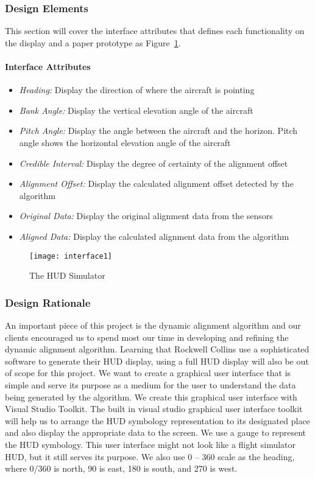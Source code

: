 		\subsubsection{Design Elements}
		This section will cover the interface attributes that defines each functionality on the display and a paper prototype as Figure~\ref{fig:interface1}.

			\paragraph{Interface Attributes}
			\begin{itemize}
				\item \textit{Heading:} Display the direction of where the aircraft is pointing  
				\item \textit{Bank Angle:} Display the vertical elevation angle of the aircraft
				\item \textit{Pitch Angle:}  Display the angle between the aircraft and the horizon. Pitch angle shows the horizontal elevation angle of the aircraft 
				\item \textit{Credible Interval:} Display the degree of certainty of the alignment offset 
				\item \textit{Alignment Offset:} Display the calculated alignment offset detected by the algorithm 
				\item \textit{Original Data:} Display the original alignment data from the sensors 
				\item \textit{Aligned Data:} Display the calculated alignment data from the algorithm 
			\end{itemize}

			\begin{figure}[h]
				\centering
			 		\caption{The HUD Simulator}			%
			      	\texttt{[image: interface1]}
			    \label{fig:interface1}
			\end{figure}

		\subsubsection{Design Rationale}
		An important piece of this project is the dynamic alignment algorithm and our clients encouraged us to spend most our time in developing and refining the dynamic alignment algorithm. Learning that Rockwell Collins use a sophisticated software to generate their HUD display, using a full HUD display will also be out of scope for this project. We want to create a graphical user interface that is simple and serve its purpose as a medium for the user to understand the data being generated by the algorithm. We create this graphical user interface with Visual Studio Toolkit. The built in visual studio graphical user interface toolkit will help us to arrange the HUD symbology representation to its designated place and also display the appropriate data to the screen. We use a gauge to represent the HUD symbology. This user interface might not look like a flight simulator HUD, but it still serves its purpose. We also use 0 – 360 scale as the heading, where 0/360 is north, 90 is east, 180 is south, and 270 is west. 
		
